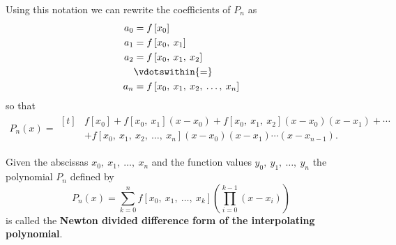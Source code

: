 \documentclass{article}
\begin{document}
Using this notation we can rewrite the coefficients of \(P_n\) as
\begin{align*}
    a_0 & = f\left[ x_0 \right]                               \\
    a_1 & = f\left[ x_0,\: x_1 \right]                        \\
    a_2 & = f\left[ x_0,\: x_1,\: x_2 \right]                 \\
        & \vdotswithin{=}                                     \\
    a_n & = f\left[ x_0,\: x_1,\: x_2,\: \dots,\: x_n \right]
\end{align*}
so that
\begin{align*}
    P_n\left( x \right) = \begin{aligned}[t]
                               & f\left[ x_0 \right] + f\left[ x_0,\: x_1 \right] \left( x - x_0 \right) + f\left[ x_0,\: x_1,\: x_2 \right] \left( x - x_0 \right) \left( x - x_1 \right) + \cdots \\
                               & + f\left[ x_0,\: x_1,\: x_2,\: \dots,\: x_n \right] \left( x - x_0 \right) \left( x - x_1 \right) \cdots \left( x - x_{n - 1} \right).
                          \end{aligned}
\end{align*}
\begin{definition}
    Given the abscissas \(x_0,\: x_1,\: \dots,\: x_n\) and the function values \(y_0,\: y_1,\: \dots,\: y_n\) the polynomial \(P_n\) defined by
    \begin{equation*}
        P_n\left( x \right) = \sum_{k = 0}^n f\left[ x_0,\: x_1,\: \dots,\: x_k \right] \left( \prod_{i = 0}^{k - 1} \left( x - x_i \right) \right)
    \end{equation*}
    is called the \textbf{Newton divided difference form of the interpolating polynomial}.
\end{definition}
\end{document}
